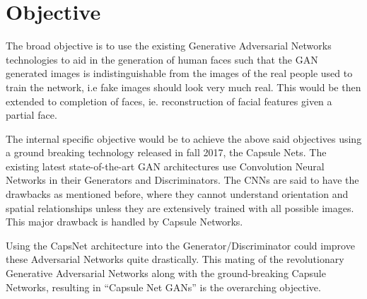 \chapter{Objective}\label{ch:objective}
The broad objective is to use the existing Generative Adversarial Networks technologies to aid in the generation of human faces such that the GAN generated images is indistinguishable from the images of the real people used to train the network, i.e fake images should look very much real. This would be then extended to completion of faces, ie. reconstruction of facial features given a partial face.\par\bigskip
The internal specific objective would be to achieve the above said objectives using a ground breaking technology released in fall 2017, the Capsule Nets. The existing latest state-of-the-art GAN architectures use Convolution Neural Networks in their Generators and Discriminators. The CNNs are said to have the drawbacks as mentioned before, where they cannot understand orientation and spatial relationships unless they are extensively trained with all possible images. This major drawback is handled by Capsule Networks.
\par\bigskip
Using the CapsNet architecture into the Generator/Discriminator could improve these Adversarial Networks quite drastically. This mating of the revolutionary Generative Adversarial Networks along with the ground-breaking Capsule Networks, resulting in “Capsule Net GANs” is the overarching objective.
